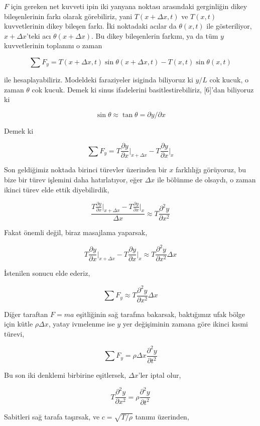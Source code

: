 \documentclass[12pt,fleqn]{article}\usepackage{../../common}
\begin{document}
$F$ için gereken net kuvveti ipin iki yanyana noktası arasındaki gerginliğin
dikey bileşenlerinin farkı olarak görebiliriz, yani $T(x+\Delta x,t)$ ve
$T(x,t)$ kuvvetlerinin dikey bileşen farkı. İki noktadaki acılar da
$\theta(x,t)$ ile gösteriliyor, $x+\Delta x$'teki acı $\theta(x+\Delta x)$. Bu
dikey bileşenlerin farkını, ya da tüm $y$ kuvvetlerinin toplanını o zaman 

$$
\sum F_y = T(x+\Delta x,t) \sin\theta(x+\Delta x,t) - T(x,t) \sin\theta(x,t)
$$

ile hesaplayabiliriz. Modeldeki faraziyeler isiginda biliyoruz ki $y/L$ cok
kucuk, o zaman $\theta$ cok kucuk. Demek ki sinus ifadelerini
basitlestirebiliriz, [6]'dan biliyoruz ki

$$
\sin\theta \approx \tan\theta = \partial y / \partial x
$$

Demek ki

$$
\sum F_y =
T \frac{\partial y}{\partial x} \bigg\vert_{x+\Delta x} -
T \frac{\partial y}{\partial x} \bigg\vert_{x}
$$

Son geldiğimiz noktada birinci türevler üzerinden bir $x$ farklılığı görüyoruz,
bu bize bir türev işlemini daha hatırlatıyor, eğer $\Delta x$ ile bölünme de
olsaydı, o zaman ikinci türev elde ettik diyebilirdik,

$$
\frac{
T \frac{\partial y}{\partial x} \bigg\vert_{x+\Delta x} -
T \frac{\partial y}{\partial x} \bigg\vert_{x}
}{\Delta x} \approx T \frac{\partial^2 y}{\partial x^2}
$$

Fakat önemli değil, biraz masajlama yaparsak, 

$$
T \frac{\partial y}{\partial x} \bigg\vert_{x+\Delta x} -
T \frac{\partial y}{\partial x} \bigg\vert_{x} \approx
T \frac{\partial^2 y}{\partial x^2} \Delta x 
$$

İstenilen sonucu elde ederiz, 

$$
\sum F_y \approx T \frac{\partial^2 y}{\partial x^2} \Delta x
$$

Diğer taraftan $F=ma$ eşitliğinin sağ tarafına bakarsak, baktığımız ufak bölge
için kütle $\rho\Delta x$, yatay ivmelenme ise $y$ yer değişiminin zamana göre
ikinci kısmi türevi,

$$
\sum F_y = \rho \Delta x \frac{\partial^2 y}{\partial t^2}
$$

Bu son iki denklemi birbirine eşitlersek, $\Delta x$'ler iptal olur, 

$$
T \frac{\partial^2 y}{\partial x^2}  =
\rho \frac{\partial^2 y}{\partial t^2}
$$

Sabitleri sağ tarafa taşırsak, ve $c = \sqrt{T / \rho}$ tanımı üzerinden,
\end{document}
